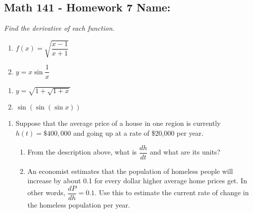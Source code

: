 \documentclass[11pt]{article}
\begin{document}

\pagestyle{empty}
\subsection*{Math 141 - Homework 7 \hfill Name: \underline{\hspace*{2in}}}

\textit{Find the derivative of each function.}
\begin{multicols}{2}
\begin{enumerate}
\item $f(x) = \sqrt{\dfrac{x - 1}{x+1}}$
\item $y = x \sin \dfrac{1}{x}$
\setcounter{enumCount}{\theenumi}
\end{enumerate}
\end{multicols}
\vfill

\begin{multicols}{2}
\begin{enumerate}
\setcounter{enumi}{\theenumCount}
\item $y = \sqrt{1+\sqrt{1+x}}$
\item $\sin(\sin(\sin x))$
\setcounter{enumCount}{\theenumi}
\end{enumerate}
\end{multicols}
\vfill


\begin{enumerate}
\setcounter{enumi}{\theenumCount}
\item Suppose that the average price of a house in one region is currently $h(t) = \$400,000$ and going up at a rate of \$20,000 per year.   
\begin{enumerate}

\item From the description above, what is $\dfrac{dh}{dt}$ and what are its units?
\vfill

\item An economist estimates that the population of homeless people will increase by about 0.1 for every dollar higher average home prices get. In other words, $\dfrac{dP}{dh} = 0.1$. Use this to estimate the current rate of change in the homeless population per year.  
\vfill

\end{enumerate}

\setcounter{enumCount}{\theenumi}
\end{enumerate}
\end{document}
